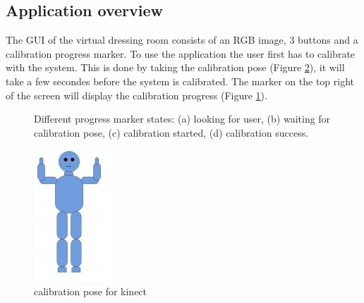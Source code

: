 \documentclass[twocolumn,a4paper]{article}
\begin{document}
\subsection{Application overview}
\label{sec:application_overview}
The GUI of the virtual dressing room consists of an RGB image, 3 buttons and a calibration progress marker. To use the application the user first has to calibrate with the system. This is done by taking the calibration pose (Figure \ref{fig:calibrationPose}), it will take a few secondes before the system is calibrated. The marker on the top right of the screen will display the calibration progress (Figure \ref{fig:progressmarker}).
\begin{figure}[h!]
\centering
	\caption{Different progress marker states: (a) looking for user, (b) waiting for calibration pose, (c) calibration started, (d) calibration success.} 
	\label{fig:progressmarker}
\end{figure}

\begin{figure}
\centering
\includegraphics[scale=0.5]{calibrationPose.png} 
\caption{calibration pose for kinect}
\label{fig:calibrationPose}
\end{figure}
\end{document}
